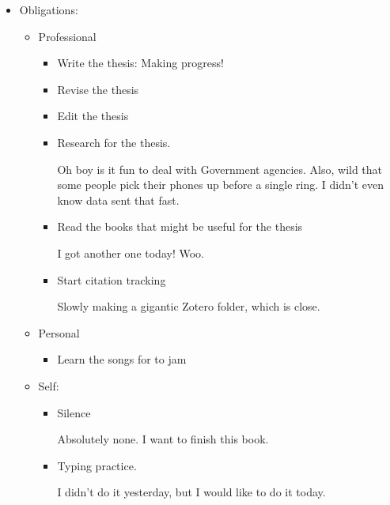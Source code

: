 \documentclass[12pt]{article}
\renewcommand{\,}{\textsuperscript{,}}
\begin{document}
\begin{itemize}

\item Obligations:

\begin{itemize}

\item Professional

\begin{itemize}

\item Write the thesis: Making progress!

\item Revise the thesis

\item Edit the thesis

\item Research for the thesis.

Oh boy is it fun to deal with Government agencies. Also, wild that some people pick their phones up before a single ring. I didn't even know data sent that fast.

\item Read the books that might be useful for the thesis

I got another one today! Woo.

\item Start citation tracking

Slowly making a gigantic Zotero folder, which is close.

\end{itemize}

\item Personal

\begin{itemize}

\item Learn the songs for to jam

\end{itemize}

\item Self:

\begin{itemize}

\item Silence

Absolutely none. I want to finish this book.

\item Typing practice.

I didn't do it yesterday, but I would like to do it today.


\end{itemize}
\end{itemize}
\end{itemize}
\end{document}
